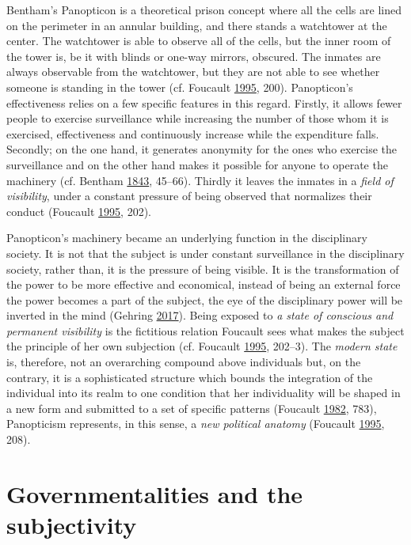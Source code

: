 \documentclass[12pt,twoside]{report}
\begin{document}
Bentham's Panopticon is a theoretical prison concept where all the cells are lined on the perimeter in an annular building, and there stands a watchtower at the center. The watchtower is able to observe all of the cells, but the inner room of the tower is, be it with blinds or one-way mirrors, obscured. The inmates are always observable from the watchtower, but they are not able to see whether someone is standing in the tower (cf. Foucault \protect\hyperlink{ref-Foucault1995}{1995}, 200). Panopticon's effectiveness relies on a few specific features in this regard. Firstly, it allows fewer people to exercise surveillance while increasing the number of those whom it is exercised, effectiveness and continuously increase while the expenditure falls. Secondly; on the one hand, it generates anonymity for the ones who exercise the surveillance and on the other hand makes it possible for anyone to operate the machinery (cf. Bentham \protect\hyperlink{ref-Bentham1843}{1843}, 45--66). Thirdly it leaves the inmates in a \emph{field of visibility}, under a constant pressure of being observed that normalizes their conduct (Foucault \protect\hyperlink{ref-Foucault1995}{1995}, 202).

Panopticon's machinery became an underlying function in the disciplinary society. It is not that the subject is under constant surveillance in the disciplinary society, rather than, it is the pressure of being visible. It is the transformation of the power to be more effective and economical, instead of being an external force the power becomes a part of the subject, the eye of the disciplinary power will be inverted in the mind (Gehring \protect\hyperlink{ref-Gehring2017}{2017}). Being exposed to \emph{a state of conscious and permanent visibility} is the fictitious relation Foucault sees what makes the subject the principle of her own subjection (cf. Foucault \protect\hyperlink{ref-Foucault1995}{1995}, 202--3). The \emph{modern state} is, therefore, not an overarching compound above individuals but, on the contrary, it is a sophisticated structure which bounds the integration of the individual into its realm to one condition that her individuality will be shaped in a new form and submitted to a set of specific patterns (Foucault \protect\hyperlink{ref-Foucault1982}{1982}, 783), Panopticism represents, in this sense, a \emph{new political anatomy} (Foucault \protect\hyperlink{ref-Foucault1995}{1995}, 208).

\hypertarget{governmentalities-and-the-subjectivity}{%
\section{Governmentalities and the subjectivity}\label{governmentalities-and-the-subjectivity}}
\end{document}
